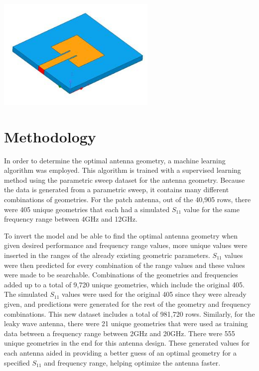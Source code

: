 \documentclass[lettersize,journal]{IEEEtran}
\newenvironment{Figure}
    {\par\medskip\noindent\minipage{\linewidth}}
    {\endminipage\par\medskip}
\begin{document}
\begin{Figure}
\centering
\includegraphics[width=3.0in]{patch_antenna.jpg}
\label{patch_antenna}
\end{Figure}


\section{Methodology}
In order to determine the optimal antenna geometry, a machine learning algorithm was employed. This algorithm is trained with a supervised learning method using the parametric sweep dataset for the antenna geometry. Because the data is generated from a parametric sweep, it contains many different combinations of geometries. For the patch antenna, out of the 40,905 rows, there were 405 unique geometries that each had a simulated $S_{11}$ value for the same frequency range between 4GHz and 12GHz.

To invert the model and be able to find the optimal antenna geometry when given desired performance and frequency range values, more unique values were inserted in the ranges of the already existing geometric parameters. $S_{11}$ values were then predicted for every combination of the range values and these values were made to be searchable. Combinations of the geometries and frequencies added up to a total of 9,720 unique geometries, which include the original 405. The simulated $S_{11}$ values were used for the original 405 since they were already given, and predictions were generated for the rest of the geometry and frequency combinations. This new dataset includes a total of 981,720 rows. Similarly, for the leaky wave antenna, there were 21 unique geometries that were used as training data between a frequency range between 2GHz and 20GHz. There were 555 unique geometries in the end for this antenna design. These generated values for each antenna aided in providing a better guess of an optimal geometry for a specified $S_{11}$ and frequency range, helping optimize the antenna faster. 
\end{document}
